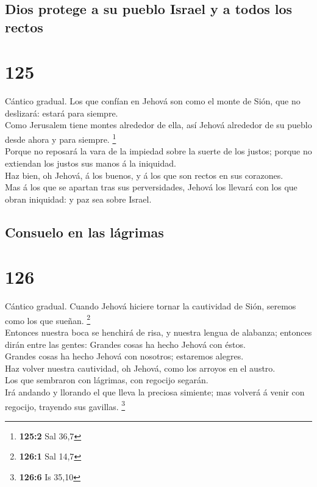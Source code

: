 \hypertarget{dios-protege-a-su-pueblo-israel-y-a-todos-los-rectos}{%
\subsection{Dios protege a su pueblo Israel y a todos los
rectos}\label{dios-protege-a-su-pueblo-israel-y-a-todos-los-rectos}}

\hypertarget{section-124}{%
\section{125}\label{section-124}}

 Cántico gradual. Los que confían en Jehová son como el
monte de Sión, que no deslizará: estará para siempre.\\
 Como Jerusalem tiene montes alrededor de ella, así Jehová
alrededor de su pueblo desde ahora y para siempre. \footnote{\textbf{125:2}
  Sal 36,7}\\
 Porque no reposará la vara de la impiedad sobre la suerte
de los justos; porque no extiendan los justos sus manos á la
iniquidad.\\
 Haz bien, oh Jehová, á los buenos, y á los que son rectos
en sus corazones.\\
 Mas á los que se apartan tras sus perversidades, Jehová los
llevará con los que obran iniquidad: y paz sea sobre Israel.

\hypertarget{consuelo-en-las-luxe1grimas}{%
\subsection{Consuelo en las
lágrimas}\label{consuelo-en-las-luxe1grimas}}

\hypertarget{section-125}{%
\section{126}\label{section-125}}

 Cántico gradual. Cuando Jehová hiciere tornar la cautividad
de Sión, seremos como los que sueñan. \footnote{\textbf{126:1} Sal 14,7}\\
 Entonces nuestra boca se henchirá de risa, y nuestra lengua
de alabanza; entonces dirán entre las gentes: Grandes cosas ha hecho
Jehová con éstos.\\
 Grandes cosas ha hecho Jehová con nosotros; estaremos
alegres.\\
 Haz volver nuestra cautividad, oh Jehová, como los arroyos
en el austro.\\
 Los que sembraron con lágrimas, con regocijo segarán.\\
 Irá andando y llorando el que lleva la preciosa simiente;
mas volverá á venir con regocijo, trayendo sus gavillas. \footnote{\textbf{126:6}
  Is 35,10}

